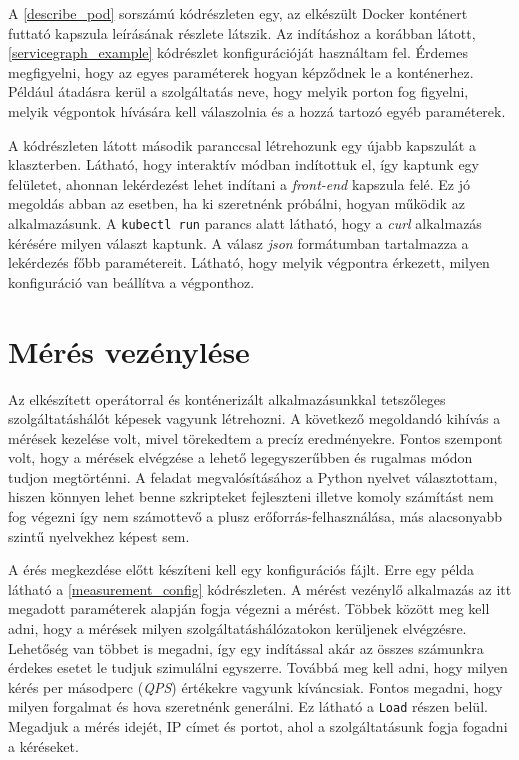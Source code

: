 A \ref{describe_pod} sorszámú kódrészleten egy, az elkészült Docker konténert futtató kapszula leírásának részlete látszik. Az indításhoz a korábban látott, \ref{servicegraph_example} kódrészlet konfigurációját használtam fel. Érdemes megfigyelni, hogy az egyes  paraméterek hogyan képződnek le a konténerhez. Például átadásra kerül a szolgáltatás neve, hogy melyik porton fog figyelni, melyik végpontok hívására kell válaszolnia és a hozzá tartozó egyéb paraméterek.

A kódrészleten látott második paranccsal létrehozunk egy újabb kapszulát a klaszterben. Látható, hogy interaktív módban indítottuk el, így kaptunk egy felületet, ahonnan lekérdezést lehet indítani a \textit{front-end} kapszula felé. Ez jó megoldás abban az esetben, ha ki szeretnénk próbálni, hogyan működik az alkalmazásunk. A \verb+kubectl run+ parancs alatt látható, hogy a \textit{curl} alkalmazás kérésére milyen választ kaptunk. A válasz \textit{json} formátumban tartalmazza a lekérdezés főbb paramétereit. Látható, hogy melyik végpontra érkezett, milyen konfiguráció van beállítva a végponthoz.



\section{Mérés vezénylése}
\label{sec:measure_orchestrate}
Az elkészített operátorral és konténerizált alkalmazásunkkal tetszőleges szolgáltatáshálót képesek vagyunk létrehozni.
A következő megoldandó kihívás a mérések kezelése volt, mivel törekedtem a precíz eredményekre. 
Fontos szempont volt, hogy a mérések elvégzése a lehető legegyszerűbben és rugalmas módon tudjon megtörténni. 
A feladat megvalósításához a Python nyelvet választottam, hiszen könnyen lehet benne szkripteket fejleszteni illetve komoly számítást nem fog végezni így nem számottevő a plusz erőforrás-felhasználása, más alacsonyabb szintű nyelvekhez képest sem. 

A érés megkezdése előtt készíteni kell egy konfigurációs fájlt. Erre egy példa látható a \ref{measurement_config} kódrészleten. A mérést vezénylő alkalmazás az itt megadott paraméterek alapján fogja végezni a mérést. Többek között meg kell adni, hogy a mérések milyen szolgáltatáshálózatokon kerüljenek elvégzésre. Lehetőség van többet is megadni, így egy indítással akár az összes számunkra érdekes esetet le tudjuk szimulálni egyszerre. Továbbá meg kell adni, hogy milyen kérés per másodperc (\textit{QPS}) értékekre vagyunk kíváncsiak. Fontos megadni, hogy milyen forgalmat és hova szeretnénk generálni. Ez látható a \verb+Load+ részen belül. Megadjuk a mérés idejét, IP címet és portot, ahol a szolgáltatásunk fogja fogadni a kéréseket.\\


